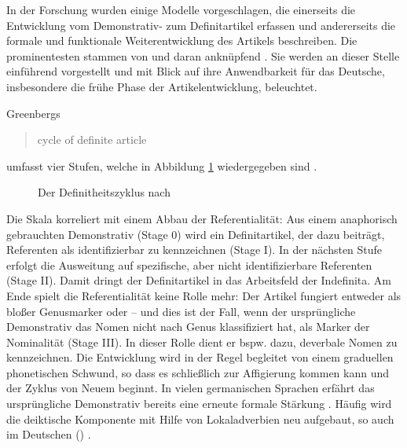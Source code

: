 In der Forschung wurden einige Modelle vorgeschlagen, die einerseits die Entwicklung vom Demonstrativ- zum Definitartikel erfassen und andererseits die formale und funktionale Weiterentwicklung des Artikels beschreiben. Die prominentesten stammen von \textcite{Greenberg1978} und daran anknüpfend \textcite{Lehmann2015}. Sie werden an dieser Stelle einführend vorgestellt und mit Blick auf ihre Anwendbarkeit für das Deutsche, insbesondere die frühe Phase der Artikelentwicklung, beleuchtet. 
%

Greenbergs \blockcquote[63]{Greenberg1978}{cycle of definite article} umfasst vier Stufen, welche in Abbildung \ref{abb:greenberg} \parencite[entnommen aus][525]{deMulder2011} wiedergegeben sind \parencite[vgl. auch][]{vanGelderen2007}. 

\begin{figure}
\caption {Der Definitheitszyklus nach \textcite{Greenberg1978}\label{abb:greenberg}}
\end{figure}

Die Skala korreliert mit einem Abbau der Referentialität: Aus einem anaphorisch gebrauchten Demonstrativ (Stage 0) wird ein Definitartikel, der dazu beiträgt, Referenten als identifizierbar zu kennzeichnen (Stage I). In der nächsten Stufe erfolgt die Ausweitung auf spezifische, aber nicht identifizierbare Referenten (Stage II). Damit dringt der Definitartikel in das Arbeitsfeld der Indefinita. Am Ende spielt die Referentialität keine Rolle mehr: Der Artikel fungiert entweder als bloßer Genusmarker oder -- und dies ist der Fall, wenn der ursprüngliche Demonstrativ das Nomen nicht nach Genus klassifiziert hat, als Marker der Nominalität \parencite[69]{Greenberg1978} (Stage III). In dieser Rolle dient er bspw. dazu, deverbale Nomen zu kennzeichnen. Die Entwicklung wird in der Regel begleitet von einem graduellen phonetischen Schwund, so dass es schließlich zur Affigierung kommen kann und der Zyklus von Neuem beginnt. In vielen germanischen Sprachen erfährt das ursprüngliche Demonstrativ bereits eine erneute formale Stärkung \parencite[302ff.]{vanGelderen2007}. Häufig wird die deiktische Komponente mit Hilfe von Lokaladverbien neu aufgebaut, so auch im Deutschen () \parencite{Diessel1999}.

